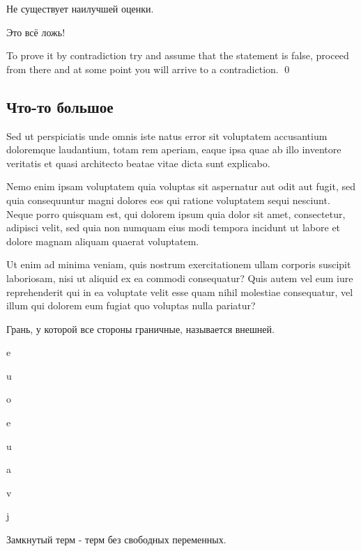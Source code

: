 \documentclass[17pt, a4paper]{extarticle}
\begin{document}
\begin{theorem}
	Не существует наилучшей оценки.
\end{theorem}

\noproof

\begin{remarkthm}
Это всё ложь!
\end{remarkthm}

\proofstart

To prove it by contradiction try and assume that the statement is false,
proceed from there and at some point you will arrive to a contradiction. \qed

\subsection{Что-то большое}

\begin{define}
Sed ut perspiciatis unde omnis iste natus error sit voluptatem accusantium doloremque laudantium, totam rem aperiam, eaque ipsa quae ab illo inventore
veritatis et quasi architecto beatae vitae dicta sunt explicabo.

Nemo enim ipsam voluptatem quia voluptas sit aspernatur aut odit aut fugit, sed quia
consequuntur magni dolores eos qui ratione voluptatem sequi nesciunt. Neque porro quisquam est, qui dolorem ipsum quia dolor sit amet, consectetur,
adipisci velit, sed quia non numquam eius modi tempora incidunt ut labore et dolore magnam aliquam quaerat voluptatem.

Ut enim ad minima veniam, quis
nostrum exercitationem ullam corporis suscipit laboriosam, nisi ut aliquid ex ea commodi consequatur? Quis autem vel eum iure reprehenderit qui in ea
voluptate velit esse quam nihil molestiae consequatur, vel illum qui dolorem eum fugiat quo voluptas nulla pariatur?
\end{define}

\begin{define}
Грань, у которой все стороны граничные, называется внешней.

e

u

o

e

u

a

v

j
\end{define}

\begin{define}
Замкнутый терм - терм без свободных переменных.

\end{define}
\end{document}

